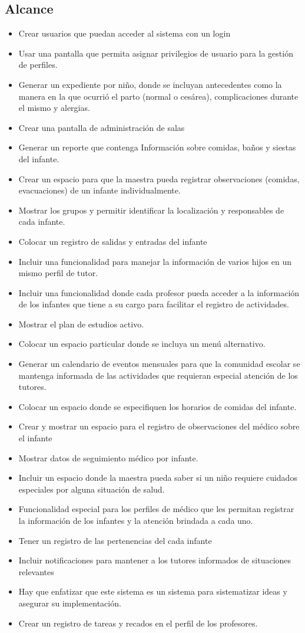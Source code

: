 \documentclass{article}
\begin{document}
\subsection{Alcance}
\begin{itemize}
	\item Crear usuarios que puedan acceder al sistema con un login
	\item Usar una pantalla que permita asignar privilegios de usuario para la gestión de perfiles.
	\item Generar un expediente por niño, donde se incluyan antecedentes como la manera en la que ocurrió el parto (normal o cesárea), complicaciones durante el mismo y alergias.
	\item Crear una pantalla de administración de salas
	\item 	Generar un reporte que contenga Información sobre comidas, baños y siestas del infante.
	\item 	Crear un espacio para que la maestra pueda registrar observaciones (comidas, evacuaciones) de un infante individualmente.
	\item 	Mostrar los grupos y permitir identificar la localización y responsables de cada infante.
	\item 	Colocar un registro de salidas y entradas del infante
	\item 	Incluir una funcionalidad para manejar la información de varios hijos en un mismo perfil de tutor.
	\item 	Incluir una funcionalidad donde cada profesor pueda acceder a la información de los infantes que tiene a su cargo para facilitar el registro de actividades.
	\item 	Mostrar el plan de estudios activo.
	\item 	Colocar un espacio particular donde se incluya un menú alternativo.
	\item 	Generar un calendario de eventos mensuales para que la comunidad escolar se mantenga informada de las actividades que requieran especial atención de los tutores.
	\item 	Colocar un espacio donde se especifiquen los horarios de comidas del infante.
	\item Crear y mostrar un espacio para el registro de observaciones del médico sobre el infante
	\item 	Mostrar datos de seguimiento médico por infante.
	\item 	Incluir un espacio donde la maestra pueda saber si un niño requiere cuidados especiales por alguna situación de salud.
	\item 	Funcionalidad especial para los perfiles de médico que les permitan registrar la información de los infantes y la atención brindada a cada uno.
	\item 	Tener un registro de las pertenencias del cada infante
	\item 	Incluir notificaciones para mantener a los tutores informados de situaciones relevantes
	\item 	Hay que enfatizar que este sistema es un sistema para sistematizar ideas y asegurar su implementación.
	\item 	Crear un registro de tareas y recados en el perfil de los profesores.

\end{itemize}
\end{document}
